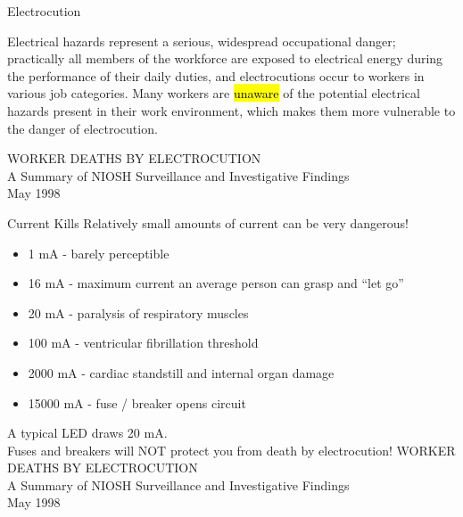 \documentclass{presentation}
\begin{document}
\begin{frame}{Electrocution}
  \begin{snugshade}
    Electrical hazards represent a serious, widespread occupational danger; practically all members of the workforce are exposed to electrical energy during the performance of their daily duties, and electrocutions occur to workers in various job categories.
    Many workers are \hl{unaware} of the potential electrical hazards present in their work environment, which makes them more vulnerable to the danger of electrocution.
  \end{snugshade}
  \vfill
  \tiny
  WORKER DEATHS BY ELECTROCUTION \\
  A Summary of NIOSH Surveillance and Investigative Findings \\
  May 1998
\end{frame}


\begin{frame}{Current Kills}
  Relatively small amounts of current can be very dangerous!
  \begin{itemize}
    \item 1 mA - barely perceptible
    \item 16 mA - maximum current an average person can grasp and ``let go''
    \item 20 mA - paralysis of respiratory muscles
    \item 100 mA - ventricular fibrillation threshold
    \item 2000 mA - cardiac standstill and internal organ damage
    \item 15000 mA - fuse / breaker opens circuit
  \end{itemize}
  A typical LED draws 20 mA. \\
  Fuses and breakers will NOT protect you from death by electrocution!
  \vfill
  \tiny
  WORKER DEATHS BY ELECTROCUTION \\
  A Summary of NIOSH Surveillance and Investigative Findings \\
  May 1998
\end{frame}
\end{document}
